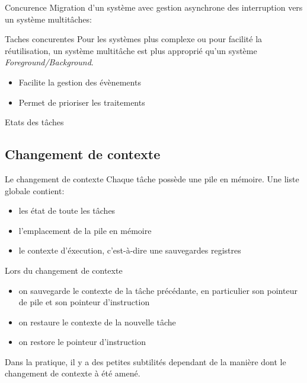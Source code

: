 \begin{frame}{Concurence}
  Migration d'un système avec gestion asynchrone des interruption vers
  un système multitâches:
  \begin{center}
  \end{center}
\end{frame} 

\begin{frame}{Taches concurentes}
  Pour les  systèmes plus complexe ou pour  facilité la réutilisation,
  un   système   multitâche   est   plus   approprié   qu'un   système
  \emph{Foreground/Background}.
  \begin{itemize} 
  \item Facilite la gestion des évènements
  \item Permet de prioriser les traitements
  \end{itemize} 
\end{frame} 

\begin{frame}{Etats des tâches}
  \begin{center}
    
  \end{center}
\end{frame} 


\subsection{Changement de contexte}

\begin{frame}{Le changement de contexte}
  Chaque tâche possède une pile en mémoire. Une liste globale contient:
  \begin{itemize} 
  \item les état de toute les tâches
  \item l'emplacement de la pile en mémoire
  \item le contexte d'éxecution, c'est-à-dire une sauvegardes registres
  \end{itemize} 
  Lors du changement de contexte
  \begin{itemize} 
  \item  on  sauvegarde  le   contexte  de  la  tâche  précédante,  en
    particulier son pointeur de pile et son pointeur d'instruction
  \item on restaure le contexte de la nouvelle tâche
  \item on restore le pointeur d'instruction
  \end{itemize} 
  Dans  la pratique, il  y a  des petites  subtilités dependant  de la
  manière dont le changement de contexte à été amené.
\end{frame} 

